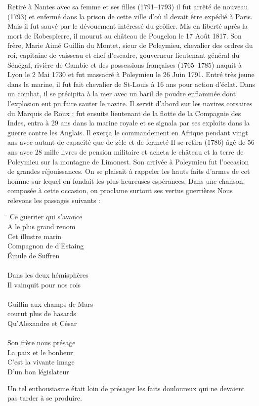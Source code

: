 Retiré à Nantes avec sa femme et ses filles (1791--1793) il fut arrêté de nouveau (1793) et enfermé dans la prison de cette ville d'où
il devait être expédié à Paris. Mais il fut sauvé par le dévouement
intéressé du geôlier. Mis en liberté après la mort de Robespierre, il
mourut au château de Pougelon le 17 Août 1817.
    Son frère, Marie Aimé Guillin du Montet, sieur de Poleymieu, chevalier
des ordres du roi, capitaine de vaisseau et chef d'escadre, gouverneur
lieutenant général du Sénégal, rivière de Gambie et des possessions
françaises (1765--1785) naquit à Lyon le 2 Mai 1730 et fut massacré
à Poleymieu le 26 Juin 1791.
    Entré très jeune dans la marine, il fut fait chevalier de St-Louis
à 16 ans pour action d'éclat. Dans un combat, il se précipita à la
mer avec un baril de poudre enflammée dont l'explosion eut pu faire
sauter le navire.
    Il servit d'abord sur les navires corsaires du Marquis de Roux ;
fut ensuite lieutenant de la flotte de la Compagnie des Indes, entra
à 29 ans dans la marine royale et se signala par ses exploits dans
la guerre contre les Anglais. Il exerça le commandement en Afrique
pendant vingt ans avec autant de capacité que de zèle et de fermeté
    Il se retira (1786) âgé de 56 ans avec 28 mille livres de pension
militaire et acheta le château et la terre de Poleymieu sur la montagne
de Limonest.
    Son arrivée à Poleymieu fut l'occasion de grandes réjouissances.
On se plaisait à rappeler les hauts faits d'armes de cet homme sur
lequel on fondait les plus heureuses espérances. Dans une chanson,
composée à cette occasion, on proclame surtout ses vertus guerrières
Nous relevons les passages suivants :
\begin{tabbing}
\hspace{0.11\textwidth}\=\kill
\>Ce guerrier qui s'avance\\
\>A le plus grand renom\\
\>Cet illustre marin\\
\>Compagnon de d'Estaing\\
\>Émule de Suffren\\
\\
\>Dans les deux hémisphères\\
\>Il vainquit pour nos rois\\
\\
\>Guillin aux champs de Mars\\
\>courut plus de hasards\\
\>Qu'Alexandre et César\\
\\
\>Son frère nous présage\\
\>La paix et le bonheur\\
\>C'est la vivante image\\
\>D'un bon législateur
\end{tabbing}
    Un tel enthousiasme était loin de présager les faits douloureux
qui ne devaient pas tarder à se produire.

